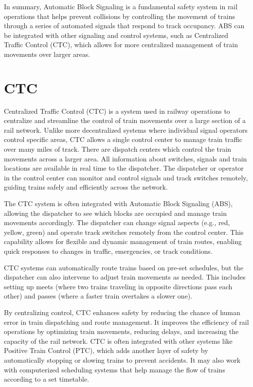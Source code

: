 In summary, Automatic Block Signaling is a fundamental safety system in rail operations that helps prevent collisions by controlling the movement of trains through a series of automated signals that respond to track occupancy. ABS can be integrated with other signaling and control systems, such as Centralized Traffic Control (CTC), which allows for more centralized management of train movements over larger areas.

\section{CTC}

Centralized Traffic Control (CTC) is a system used in railway operations to centralize and streamline the control of train movements over a large section of a rail network. Unlike more decentralized systems where individual signal operators control specific areas, CTC allows a single control center to manage train traffic over many miles of track. There are dispatch centers which control the train movements across a larger area. All information about switches, signals and train locations are available in real time to the dispatcher. The dispatcher or operator in the control center can monitor and control signals and track switches remotely, guiding trains safely and efficiently across the network.

The CTC system is often integrated with Automatic Block Signaling (ABS), allowing the dispatcher to see which blocks are occupied and manage train movements accordingly. The dispatcher can change signal aspects (e.g., red, yellow, green) and operate track switches remotely from the control center. This capability allows for flexible and dynamic management of train routes, enabling quick responses to changes in traffic, emergencies, or track conditions.

CTC systems can automatically route trains based on pre-set schedules, but the dispatcher can also intervene to adjust train movements as needed. This includes setting up meets (where two trains traveling in opposite directions pass each other) and passes (where a faster train overtakes a slower one).

By centralizing control, CTC enhances safety by reducing the chance of human error in train dispatching and route management. It improves the efficiency of rail operations by optimizing train movements, reducing delays, and increasing the capacity of the rail network. CTC is often integrated with other systems like Positive Train Control (PTC), which adds another layer of safety by automatically stopping or slowing trains to prevent accidents. It may also work with computerized scheduling systems that help manage the flow of trains according to a set timetable.

